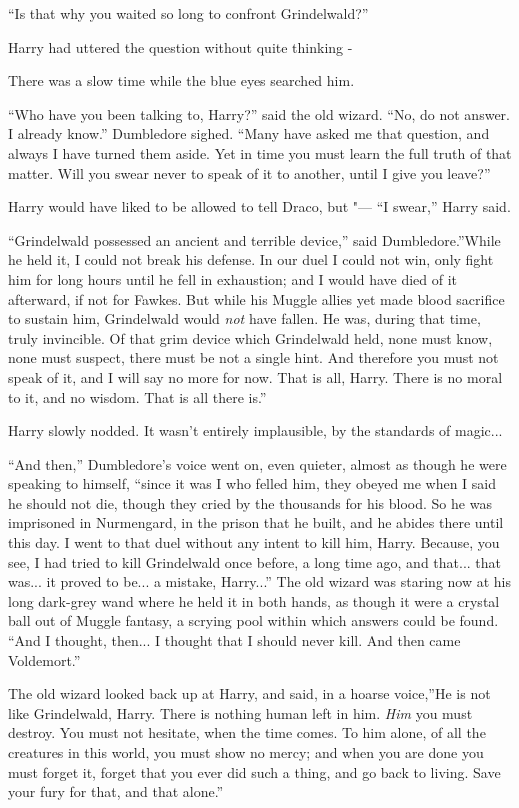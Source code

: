 ``Is that why you waited so long to confront Grindelwald?''

Harry had uttered the question without quite thinking -

There was a slow time while the blue eyes searched him.

``Who have you been talking to, Harry?'' said the old wizard. ``No, do
not answer. I already know.'' Dumbledore sighed. ``Many have asked me
that question, and always I have turned them aside. Yet in time you must
learn the full truth of that matter. Will you swear never to speak of it
to another, until I give you leave?''

Harry would have liked to be allowed to tell Draco, but "--- ``I swear,''
Harry said.

``Grindelwald possessed an ancient and terrible device,'' said
Dumbledore.''While he held it, I could not break his defense. In our
duel I could not win, only fight him for long hours until he fell in
exhaustion; and I would have died of it afterward, if not for Fawkes.
But while his Muggle allies yet made blood sacrifice to sustain him,
Grindelwald would \emph{not} have fallen. He was, during that time,
truly invincible. Of that grim device which Grindelwald held, none must
know, none must suspect, there must be not a single hint. And therefore
you must not speak of it, and I will say no more for now. That is all,
Harry. There is no moral to it, and no wisdom. That is all there is.''

Harry slowly nodded. It wasn't entirely implausible, by the standards of
magic...

``And then,'' Dumbledore's voice went on, even quieter, almost as though
he were speaking to himself, ``since it was I who felled him, they
obeyed me when I said he should not die, though they cried by the
thousands for his blood. So he was imprisoned in Nurmengard, in the
prison that he built, and he abides there until this day. I went to that
duel without any intent to kill him, Harry. Because, you see, I had
tried to kill Grindelwald once before, a long time ago, and that...
that was... it proved to be... a mistake, Harry...'' The
old wizard was staring now at his long dark-grey wand where he held it
in both hands, as though it were a crystal ball out of Muggle fantasy, a
scrying pool within which answers could be found. ``And I thought,
then... I thought that I should never kill. And then came
Voldemort.''

The old wizard looked back up at Harry, and said, in a hoarse voice,''He
is not like Grindelwald, Harry. There is nothing human left in him.
\emph{Him} you must destroy. You must not hesitate, when the time comes.
To him alone, of all the creatures in this world, you must show no
mercy; and when you are done you must forget it, forget that you ever
did such a thing, and go back to living. Save your fury for that, and
that alone.''

